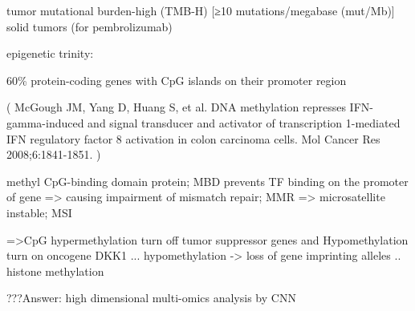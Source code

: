 \documentclass[preprint,12pt]{elsarticle}
\newenvironment{MyColorPar}[1]{%
    \leavevmode\color{#1}\ignorespaces%
}{%
}%
\begin{document}
\begin{MyColorPar}{blue}
tumor mutational burden-high (TMB-H) [≥10 mutations/megabase (mut/Mb)] solid tumors (for pembrolizumab)

epigenetic trinity:

60\% protein-coding genes with CpG islands on their promoter region

(
McGough JM, Yang D, Huang S, et al. DNA methylation represses IFN-gamma-induced and signal transducer and activator of transcription 1-mediated IFN regulatory factor 8 activation in colon carcinoma cells. Mol Cancer Res 2008;6:1841-1851.
)

methyl CpG-binding domain protein; MBD prevents TF binding on the promoter of gene
=> causing impairment of mismatch repair; MMR => microsatellite instable; MSI

=>CpG hypermethylation
turn off tumor suppressor genes
and
Hypomethylation turn on oncogene
DKK1
...
hypomethylation ->
loss of gene imprinting
alleles 
..
histone methylation




???Answer:
high dimensional multi-omics analysis by CNN 


\end{MyColorPar}
\end{document}
